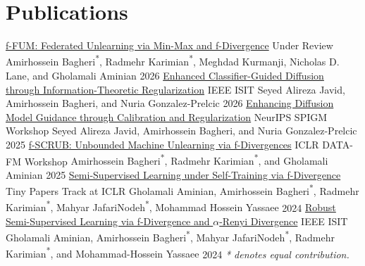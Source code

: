 \section{Publications}
\resumeSubHeadingListStart
  \publication
    {\href{https://arxiv.org/abs/2602.06187}{f-FUM: Federated Unlearning via Min-Max and f-Divergence}}
    {Under Review}
    {Amirhossein Bagheri\textsuperscript{*}, Radmehr Karimian\textsuperscript{*}, Meghdad Kurmanji, Nicholas D. Lane, and Gholamali Aminian}
    {2026}
  \publication
    {\href{https://dblp.org/rec/conf/isit/JavidBG26}{Enhanced Classifier-Guided Diffusion through Information-Theoretic Regularization}}
    {IEEE ISIT}
    {Seyed Alireza Javid, Amirhossein Bagheri, and Nuria Gonzalez-Prelcic}
    {2026}
  \publication
    {\href{https://neurips.cc/virtual/2025/125408}{Enhancing Diffusion Model Guidance through Calibration and Regularization}}
    {NeurIPS SPIGM Workshop}
    {Seyed Alireza Javid, Amirhossein Bagheri, and Nuria Gonzalez-Prelcic}
    {2025}
  \publication
    {\href{https://iclr.cc/virtual/2025/34438}{f-SCRUB: Unbounded Machine Unlearning via f-Divergences}}
    {ICLR DATA-FM Workshop}
    {Amirhossein Bagheri\textsuperscript{*}, Radmehr Karimian\textsuperscript{*}, and Gholamali Aminian}
    {2025}
  \publication
    {\href{https://dblp.org/rec/conf/iclr/AminianBKJY24}{Semi-Supervised Learning under Self-Training via f-Divergence}}
    {Tiny Papers Track at ICLR}
    {Gholamali Aminian, Amirhossein Bagheri\textsuperscript{*}, Radmehr Karimian\textsuperscript{*}, Mahyar JafariNodeh\textsuperscript{*}, Mohammad Hossein Yassaee}
    {2024}
  \publication
    {\href{https://arxiv.org/abs/2405.00454}{Robust Semi-Supervised Learning via f-Divergence and $\alpha$-Renyi Divergence}}
    {IEEE ISIT}
    {Gholamali Aminian, Amirhossein Bagheri\textsuperscript{*}, Mahyar JafariNodeh\textsuperscript{*}, Radmehr Karimian\textsuperscript{*}, and Mohammad-Hossein Yassaee}
    {2024}
\resumeSubHeadingListEnd
\vspace{-2pt}
\hfill{\small\textit{* denotes equal contribution.}}\par\vspace{-2pt}
